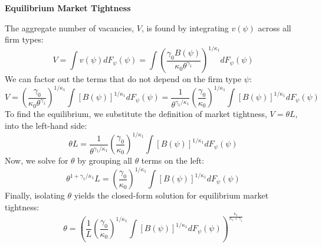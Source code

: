 \documentclass[
  11pt,
  letterpaper,
  DIV=11,
  numbers=noendperiod]{scrartcl}
\begin{document}
\textbf{Equilibrium Market Tightness}

The aggregate number of vacancies, \(V\), is found by integrating
\(v(\psi)\) across all firm types: \[
V = \int v(\psi) dF_{\psi}(\psi) = \int \left( \frac{\gamma_0 B(\psi)}{\kappa_0 \theta^{\gamma_1}} \right)^{1/\kappa_1} dF_{\psi}(\psi)
\] We can factor out the terms that do not depend on the firm type
\(\psi\): \[
V = \left( \frac{\gamma_0}{\kappa_0 \theta^{\gamma_1}} \right)^{1/\kappa_1} \int [B(\psi)]^{1/\kappa_1} dF_{\psi}(\psi) = \frac{1}{\theta^{\gamma_1/\kappa_1}} \left( \frac{\gamma_0}{\kappa_0} \right)^{1/\kappa_1} \int [B(\psi)]^{1/\kappa_1} dF_{\psi}(\psi)
\] To find the equilibrium, we substitute the definition of market
tightness, \(V = \theta L\), into the left-hand side: \[
\theta L = \frac{1}{\theta^{\gamma_1/\kappa_1}} \left( \frac{\gamma_0}{\kappa_0} \right)^{1/\kappa_1} \int [B(\psi)]^{1/\kappa_1} dF_{\psi}(\psi)
\] Now, we solve for \(\theta\) by grouping all \(\theta\) terms on the
left: \[
\theta^{1 + \gamma_1/\kappa_1} L = \left( \frac{\gamma_0}{\kappa_0} \right)^{1/\kappa_1} \int [B(\psi)]^{1/\kappa_1} dF_{\psi}(\psi)
\] Finally, isolating \(\theta\) yields the closed-form solution for
equilibrium market tightness: \[
\theta = \left( \frac{1}{L} \left( \frac{\gamma_0}{\kappa_0} \right)^{1/\kappa_1} \int [B(\psi)]^{1/\kappa_1} dF_{\psi}(\psi) \right)^{\frac{\kappa_1}{\kappa_1 + \gamma_1}}
\]
\end{document}
